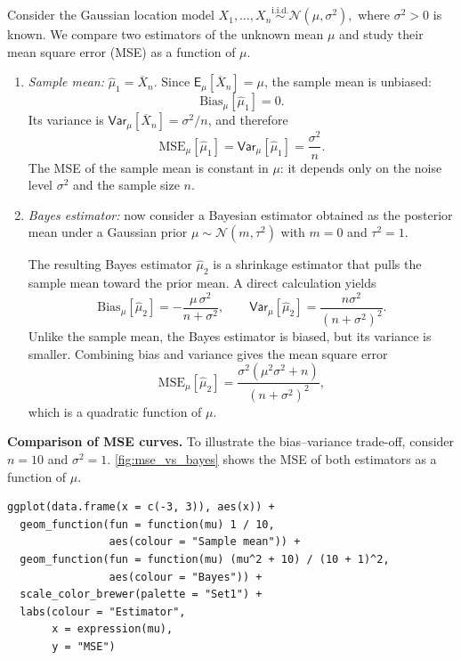 \label{par:gauss_vs_bayes}

Consider the Gaussian location model
\(
X_1,\dots,X_n \stackrel{\text{i.i.d.}}{\sim} \mathcal{N}(\mu,\sigma^2),
\)
where $\sigma^2>0$ is known. We compare two estimators of the unknown mean $\mu$ and study their mean square error (MSE) as a function of $\mu$.

\begin{enumerate}[]
    \item 
\emph{Sample mean:} 
$\hat{\mu}_1=\overline{X}_n$.
Since $\mathsf{E}_{\mu}[\overline{X}_n]=\mu$, the sample mean is unbiased:
\[
\text{Bias}_{\mu}[\hat{\mu}_1]=0.
\]
Its variance is $\mathsf{Var}_{\mu}[\overline{X}_n]=\sigma^2/n$, and therefore
\[
\text{MSE}_{\mu}[\hat{\mu}_1]
=\mathsf{Var}_{\mu}[\hat{\mu}_1]
=\frac{\sigma^2}{n}.
\]
The MSE of the sample mean is constant in $\mu$: it depends only on the noise level $\sigma^2$ and the sample size $n$.

\item 
\emph{Bayes estimator:}
now consider a Bayesian estimator obtained as the posterior mean under a Gaussian prior
\(
\mu \sim \mathcal{N}(m,\tau^2)
\)
with $m=0$ and $\tau^2=1$. 

The resulting Bayes estimator $\hat{\mu}_2$ is a shrinkage estimator that pulls the sample mean toward the prior mean.
A direct calculation yields
\[
\text{Bias}_{\mu}[\hat{\mu}_2]
= -\frac{\mu\,\sigma^2}{n+\sigma^2},
\qquad
\mathsf{Var}_{\mu}[\hat{\mu}_2]
= \frac{n\sigma^2}{(n+\sigma^2)^2}.
\]
Unlike the sample mean, the Bayes estimator is biased, but its variance is smaller.
Combining bias and variance gives the mean square error
\[
\text{MSE}_{\mu}[\hat{\mu}_2]
= \frac{\sigma^2(\mu^2\sigma^2+n)}{(n+\sigma^2)^2},
\]
which is a quadratic function of $\mu$.
\end{enumerate}

\noindent
\textbf{Comparison of MSE curves.}
To illustrate the bias--variance trade-off, consider $n=10$ and $\sigma^2=1$.
\autoref{fig:mse_vs_bayes} shows the MSE of both estimators as a function of $\mu$.

\begin{verbatim}
ggplot(data.frame(x = c(-3, 3)), aes(x)) +
  geom_function(fun = function(mu) 1 / 10,
                aes(colour = "Sample mean")) +
  geom_function(fun = function(mu) (mu^2 + 10) / (10 + 1)^2,
                aes(colour = "Bayes")) +
  scale_color_brewer(palette = "Set1") +
  labs(colour = "Estimator",
       x = expression(mu),
       y = "MSE")
\end{verbatim}

